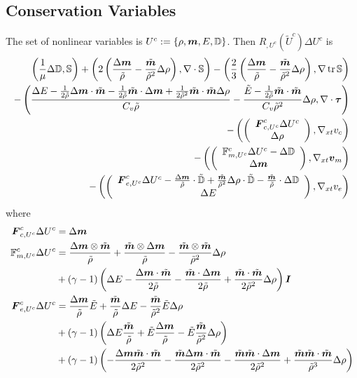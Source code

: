 \documentclass{article}
\begin{document}
\subsection*{Conservation Variables}
The set of nonlinear variables is $U^c:=\left\{ \rho,\boldsymbol m,E,\mathbb{D} \right\}$.
Then $R_{,U^c}(\tilde U^c)\Delta U^c$ is
\label{eq:conservationJacobian}
\begin{align*}
	\left( \frac{1}{\mu}\Delta\mathbb{D},\mathbb{S} \right)+\left( 2\left( \frac{\Delta\boldsymbol m}{\tilde\rho}-\frac{\tilde{\boldsymbol m}}{\tilde\rho^2}\Delta\rho \right),\nabla\cdot\mathbb{S} \right)
	-\left( \frac{2}{3}\left( \frac{\Delta\boldsymbol m}{\tilde\rho}-\frac{\tilde{\boldsymbol m}}{\tilde\rho^2}\Delta\rho \right),\nabla\operatorname*{tr}{\mathbb{S}} \right)\\
	-\left( \frac{\Delta E-\frac{1}{2\tilde\rho}\Delta\boldsymbol m\cdot\tilde{\boldsymbol m}-\frac{1}{2\tilde\rho}\tilde{\boldsymbol m}\cdot\Delta\boldsymbol m
	+\frac{1}{2\tilde\rho^2}\tilde{\boldsymbol m}\cdot\tilde{\boldsymbol m}\Delta\rho}{C_v\tilde\rho}
	-\frac{\tilde E-\frac{1}{2\tilde\rho}\tilde{\boldsymbol m}\cdot\tilde{\boldsymbol m}}{C_v\tilde\rho^2}\Delta\rho,\nabla\cdot\boldsymbol\tau \right)\\
	-\left( \left( \begin{array}{c} \boldsymbol F^c_{c,U^c}\Delta U^c\\ \Delta\rho\\ \end{array} \right),\nabla_{xt} v_c \right)\\
	-\left( \left( \begin{array}{c} \mathbb{F}^c_{m,U^c}\Delta U^c-\Delta\mathbb{D}\\ \Delta\boldsymbol m\\ \end{array} \right),\nabla_{xt}\boldsymbol v_m \right)\\
	-\left( \left( \begin{array}{c} \boldsymbol F^c_{e,U^c}\Delta U^c-\frac{\Delta\boldsymbol m}{\tilde\rho}\cdot\tilde{\mathbb{D}}
	+\frac{\tilde{\boldsymbol m}}{\tilde\rho^2}\Delta\rho\cdot\tilde{\mathbb{D}}-\frac{\tilde{\boldsymbol m}}{\tilde\rho}\cdot\Delta\mathbb{D}\\ \Delta E\\ \end{array} \right),\nabla_{xt} v_e \right)
\end{align*}
where
\begin{align*}
\boldsymbol F^c_{c,U^c}\Delta U^c&=\Delta\boldsymbol m\\
\mathbb{F}^c_{m,U^c}\Delta U^c&=
\frac{\Delta\boldsymbol m\otimes\tilde{\boldsymbol m}}{\tilde\rho}
+\frac{\tilde{\boldsymbol m}\otimes\Delta\boldsymbol m}{\tilde\rho}
-\frac{\tilde{\boldsymbol m}\otimes\tilde{\boldsymbol m}}{\tilde\rho^2}\Delta\rho\\
&+(\gamma-1)\left( \Delta E
-\frac{\Delta\boldsymbol m\cdot\tilde{\boldsymbol m}}{2\tilde\rho}
-\frac{\tilde{\boldsymbol m}\cdot\Delta\boldsymbol m}{2\tilde\rho}
+\frac{\tilde{\boldsymbol m}\cdot\tilde{\boldsymbol m}}{2\tilde\rho^2}\Delta\rho
 \right)\boldsymbol I\\
\boldsymbol F^c_{e,U^c}\Delta U^c&=
\frac{\Delta\boldsymbol m}{\tilde\rho}\tilde E
+\frac{\tilde{\boldsymbol m}}{\tilde\rho}\Delta E
-\frac{\tilde{\boldsymbol m}}{\tilde\rho^2}\tilde E\Delta\rho\\
&+(\gamma-1)\left( 
\Delta E\frac{\tilde{\boldsymbol m}}{\tilde\rho}
+\tilde E\frac{\Delta\boldsymbol m}{\tilde\rho}
-\tilde E\frac{\tilde{\boldsymbol m}}{\tilde\rho^2}\Delta\rho \right)\\
&+(\gamma-1)\left( 
-\frac{\Delta\boldsymbol m\tilde{\boldsymbol m}\cdot\tilde{\boldsymbol m}}{2\tilde\rho^2}
-\frac{\tilde{\boldsymbol m}\Delta\boldsymbol m\cdot\tilde{\boldsymbol m}}{2\tilde\rho^2}
-\frac{\tilde{\boldsymbol m}\tilde{\boldsymbol m}\cdot\Delta\boldsymbol m}{2\tilde\rho^2}
+\frac{\tilde{\boldsymbol m}\tilde{\boldsymbol m}\cdot\tilde{\boldsymbol m}}{\tilde\rho^3}\Delta\rho
 \right)\\
\end{align*}
\end{document}
